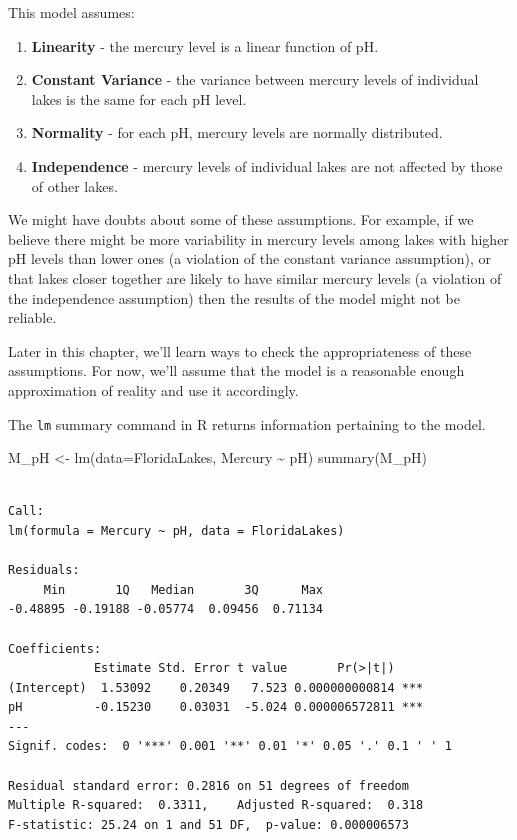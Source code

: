 \documentclass[
  letterpaper,
  DIV=11,
  numbers=noendperiod]{scrreprt}
\newenvironment{Shaded}{\begin{snugshade}}{\end{snugshade}}
\newcommand{\AttributeTok}[1]{\textcolor[rgb]{0.40,0.45,0.13}{#1}}
\newcommand{\FunctionTok}[1]{\textcolor[rgb]{0.28,0.35,0.67}{#1}}
\newcommand{\NormalTok}[1]{\textcolor[rgb]{0.00,0.23,0.31}{#1}}
\newcommand{\OtherTok}[1]{\textcolor[rgb]{0.00,0.23,0.31}{#1}}
\newcommand{\SpecialCharTok}[1]{\textcolor[rgb]{0.37,0.37,0.37}{#1}}
\begin{document}
This model assumes:

\begin{enumerate}
\def\labelenumi{\arabic{enumi}.}
\item
  \textbf{Linearity} - the mercury level is a linear function of pH.
\item
  \textbf{Constant Variance} - the variance between mercury levels of
  individual lakes is the same for each pH level.
\item
  \textbf{Normality} - for each pH, mercury levels are normally
  distributed.
\item
  \textbf{Independence} - mercury levels of individual lakes are not
  affected by those of other lakes.
\end{enumerate}

We might have doubts about some of these assumptions. For example, if we
believe there might be more variability in mercury levels among lakes
with higher pH levels than lower ones (a violation of the constant
variance assumption), or that lakes closer together are likely to have
similar mercury levels (a violation of the independence assumption) then
the results of the model might not be reliable.

Later in this chapter, we'll learn ways to check the appropriateness of
these assumptions. For now, we'll assume that the model is a reasonable
enough approximation of reality and use it accordingly.

The \texttt{lm} summary command in R returns information pertaining to
the model.

\begin{Shaded}
\begin{Highlighting}[]
\NormalTok{M\_pH }\OtherTok{\textless{}{-}} \FunctionTok{lm}\NormalTok{(}\AttributeTok{data=}\NormalTok{FloridaLakes, Mercury }\SpecialCharTok{\textasciitilde{}}\NormalTok{ pH)}
\FunctionTok{summary}\NormalTok{(M\_pH)}
\end{Highlighting}
\end{Shaded}

\begin{verbatim}

Call:
lm(formula = Mercury ~ pH, data = FloridaLakes)

Residuals:
     Min       1Q   Median       3Q      Max 
-0.48895 -0.19188 -0.05774  0.09456  0.71134 

Coefficients:
            Estimate Std. Error t value       Pr(>|t|)    
(Intercept)  1.53092    0.20349   7.523 0.000000000814 ***
pH          -0.15230    0.03031  -5.024 0.000006572811 ***
---
Signif. codes:  0 '***' 0.001 '**' 0.01 '*' 0.05 '.' 0.1 ' ' 1

Residual standard error: 0.2816 on 51 degrees of freedom
Multiple R-squared:  0.3311,    Adjusted R-squared:  0.318 
F-statistic: 25.24 on 1 and 51 DF,  p-value: 0.000006573
\end{verbatim}
\end{document}
